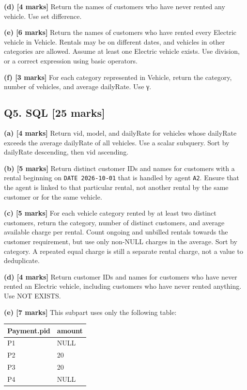 \textbf{(d) {[}4 marks{]}} Return the names of customers who have never rented any vehicle. Use set difference.

\textbf{(e) {[}6 marks{]}} Return the names of customers who have rented every Electric vehicle in Vehicle. Rentals may be on different dates, and vehicles in other categories are allowed. Assume at least one Electric vehicle exists. Use division, or a correct expression using basic operators.

\textbf{(f) {[}3 marks{]}} For each category represented in Vehicle, return the category, number of vehicles, and average dailyRate. Use γ.

\subsection{Q5. SQL {[}25 marks{]}}\label{practice_paper_2-q5.-sql-25-marks}

\textbf{(a) {[}4 marks{]}} Return vid, model, and dailyRate for vehicles whose dailyRate exceeds the average dailyRate of all vehicles. Use a scalar subquery. Sort by dailyRate descending, then vid ascending.

\textbf{(b) {[}5 marks{]}} Return distinct customer IDs and names for customers with a rental beginning on \texttt{DATE\ \textquotesingle{}2026-10-01\textquotesingle{}} that is handled by agent \texttt{\textquotesingle{}A2\textquotesingle{}}. Ensure that the agent is linked to that particular rental, not another rental by the same customer or for the same vehicle.

\textbf{(c) {[}5 marks{]}} For each vehicle category rented by at least two distinct customers, return the category, number of distinct customers, and average available charge per rental. Count ongoing and unbilled rentals towards the customer requirement, but use only non-NULL charges in the average. Sort by category. A repeated equal charge is still a separate rental charge, not a value to deduplicate.

\textbf{(d) {[}4 marks{]}} Return customer IDs and names for customers who have never rented an Electric vehicle, including customers who have never rented anything. Use NOT EXISTS.

\textbf{(e) {[}7 marks{]}} This subpart uses only the following table:

\begin{longtable}[]{@{}ll@{}}
\toprule\noalign{}
Payment.pid & amount \\
\midrule\noalign{}
\endhead
\bottomrule\noalign{}
\endlastfoot
P1 & NULL \\
P2 & 20 \\
P3 & 20 \\
P4 & NULL \\
\end{longtable}

